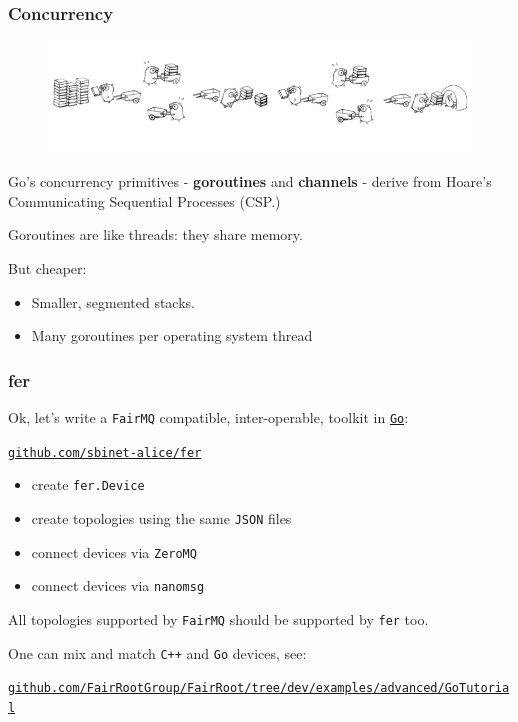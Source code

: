 \documentclass[9pt]{beamer}
\newcommand{\myblue} [1] {{\color{blue}#1}}
\begin{document}
\begin{frame}[fragile]
\frametitle{Concurrency}


\begin{figure}[h]
\begin{center}
\includegraphics[width=\textwidth]{_figs/busy.jpg}
\end{center}

\end{figure}

Go's concurrency primitives - \textbf{goroutines} and \textbf{channels} - derive from Hoare's Communicating Sequential Processes (CSP.)


Goroutines are like threads: they share memory.


But cheaper:


\begin{itemize}
\item Smaller, segmented stacks.
\item Many goroutines per operating system thread
\end{itemize}


\end{frame}

\begin{frame}[fragile]
\frametitle{fer}


Ok, let's write a \texttt{FairMQ} compatible, inter-operable, toolkit in \myblue{\href{https://golang.org}{\texttt{Go}}}:

	\begin{center}
\myblue{\href{https://github.com/sbinet-alice/fer}{\texttt{github.com/sbinet-alice/fer}}}
	\end{center}

\begin{itemize}
\item create \texttt{fer.Device}
\item create topologies using the same \texttt{JSON} files
\item connect devices via \texttt{ZeroMQ}
\item connect devices via \texttt{nanomsg}
\end{itemize}

All topologies supported by \texttt{FairMQ} should be supported by \texttt{fer} too.

One can mix and match \texttt{C++} and \texttt{Go} devices, see:


\myblue{\href{https://github.com/FairRootGroup/FairRoot/tree/dev/examples/advanced/GoTutorial}{\texttt{github.com/FairRootGroup/FairRoot/tree/dev/examples/advanced/GoTutorial}}}


\end{frame}
\end{document}
